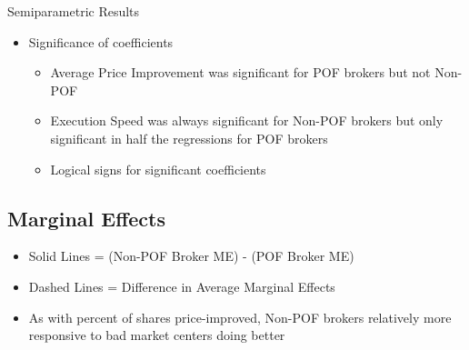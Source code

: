 \documentclass[11pt]{beamer}
\begin{document}
\begin{frame}


	\begin{block}
	{Semiparametric Results}
		\begin{itemize}
			\item Significance of coefficients
			\begin{itemize}
				\setlength\itemsep{0.4em}
				\item Average Price Improvement was significant for POF brokers but not Non-POF
				\item Execution Speed was always significant for Non-POF brokers but only significant in half the regressions for POF brokers
				\item Logical signs for significant coefficients
			\end{itemize}
	
		\end{itemize}
	\end{block}


\end{frame}



\subsection{Marginal Effects}

\begin{frame}


\begin{itemize}
	\setlength\itemsep{0.35em}
	\item Solid Lines = (Non-POF Broker ME) - (POF Broker ME)
	\item Dashed Lines = Difference in Average Marginal Effects
\end{itemize}

\end{frame}

\begin{frame}


\begin{itemize}
	\setlength\itemsep{0.4em}
	\item As with percent of shares price-improved, Non-POF brokers relatively more responsive to bad market centers doing better
\end{itemize}

\end{frame}
\end{document}
